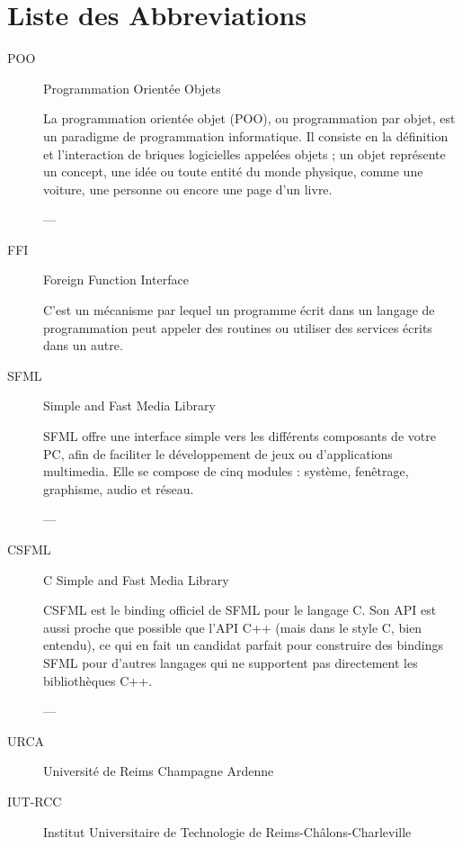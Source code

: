 \documentclass[11pt,a4paper,krantz2,11pt,oneside]{krantz}
\renewenvironment{quote}{\begin{VF}}{\end{VF}}
\begin{document}
\hypertarget{liste-des-abbreviations}{%
\chapter*{Liste des Abbreviations}\label{liste-des-abbreviations}}


\begin{description}
\item[POO]
Programmation Orientée Objets

\begin{quote}
La programmation orientée objet (POO), ou programmation par objet, est un paradigme de programmation informatique. Il consiste en la définition et l'interaction de briques logicielles appelées objets ; un objet représente un concept, une idée ou toute entité du monde physique, comme une voiture, une personne ou encore une page d'un livre.
\end{quote}

--- \citep{wikipedia_programmation_2020}
\item[FFI]
Foreign Function Interface

C'est un mécanisme par lequel un programme écrit dans un langage de programmation peut appeler des routines ou utiliser des services écrits dans un autre.
\item[SFML]
Simple and Fast Media Library

\begin{quote}
SFML offre une interface simple vers les différents composants de votre PC, afin de faciliter le développement de jeux ou d'applications multimedia. Elle se compose de cinq modules : système, fenêtrage, graphisme, audio et réseau.
\end{quote}

--- \citep{laurent_sfml_2020}
\item[CSFML]
C Simple and Fast Media Library

\begin{quote}
CSFML est le binding officiel de SFML pour le langage C. Son API est aussi proche que possible que l'API C++ (mais dans le style C, bien entendu), ce qui en fait un candidat parfait pour construire des bindings SFML pour d'autres langages qui ne supportent pas directement les bibliothèques C++.
\end{quote}

--- \citep{laurent_sfml_2020}
\item[URCA]
Université de Reims Champagne Ardenne
\item[IUT-RCC]
Institut Universitaire de Technologie de Reims-Châlons-Charleville
\end{description}
\end{document}

